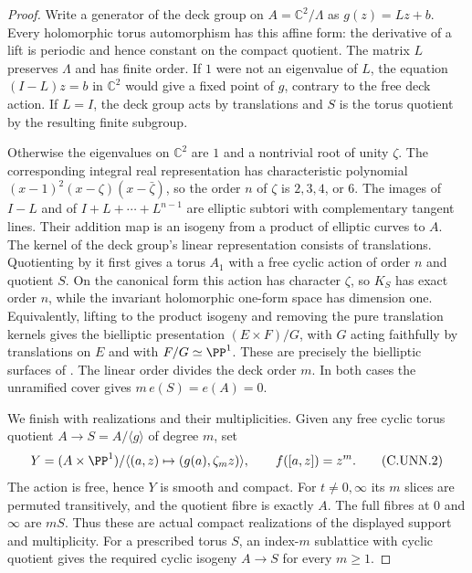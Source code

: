 \begin{proof}
Write a generator of the deck group on
$A=\mathbb C^2/\Lambda$ as $g(z)=Lz+b$.
Every holomorphic torus automorphism has this affine
form: the derivative of a lift is periodic and hence
constant on the compact quotient. The matrix $L$
preserves $\Lambda$ and has finite order. If $1$
were not an eigenvalue of $L$, the equation
$(I-L)z=b$ in $\mathbb C^2$ would give a fixed
point of $g$, contrary to the free deck action.
If $L=I$, the deck group acts by translations and
$S$ is the torus quotient by the resulting finite
subgroup.

Otherwise the eigenvalues on $\mathbb C^2$ are
$1$ and a nontrivial root of unity $\zeta$.
The corresponding integral real representation
has characteristic polynomial
$(x-1)^2(x-\zeta)(x-\bar\zeta)$, so the order
$n$ of $\zeta$ is $2,3,4$, or $6$. The images of
$I-L$ and of $I+L+\cdots+L^{n-1}$ are elliptic
subtori with complementary tangent lines. Their
addition map is an isogeny from a product of
elliptic curves to $A$. The kernel of the deck
group's linear representation consists of
translations. Quotienting by it first gives a
torus $A_1$ with a free cyclic action of order
$n$ and quotient $S$. On the canonical form
this action has character $\zeta$, so $K_S$
has exact order $n$, while the invariant
holomorphic one-form space has dimension one.
Equivalently, lifting to the product isogeny
and removing the pure translation kernels gives
the bielliptic presentation
$(E\times F)/G$, with $G$ acting faithfully
by translations on $E$ and with $F/G\simeq\PP^1$.
These are precisely the bielliptic surfaces
of \cite[Definition~3.1 and Theorems~3.2--3.3]{Catanese2002}.
The linear order divides the deck order $m$.
In both cases the unramified cover gives
$m\,e(S)=e(A)=0$.

We finish with realizations and their multiplicities.
Given any free cyclic torus quotient
$A\to S=A/\langle g\rangle$ of degree $m$, set
\[
 Y=(A\times\PP^1)/\langle(a,z)\mapsto
                         (g(a),\zeta_m z)\rangle,
 \qquad f([a,z])=z^m.
 \tag{C.UNN.2}
\]
The action is free, hence $Y$ is smooth and compact.
For $t\ne0,\infty$ its $m$ slices are permuted
transitively, and the quotient fibre is exactly
$A$. The full fibres at $0$ and $\infty$ are
$mS$. Thus these are actual compact realizations
of the displayed support and multiplicity.
For a prescribed torus $S$, an index-$m$ sublattice
with cyclic quotient gives the required cyclic
isogeny $A\to S$ for every $m\ge1$.


\end{proof}
